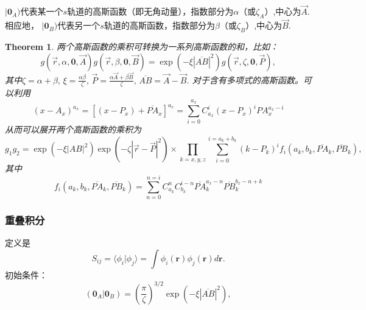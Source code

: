 \documentclass[12pt,a4paper,openany,twoside]{article}
\newtheorem{theorem}{Theorem}[section]
\numberwithin{equation}{section}
\begin{document}
            $|\boldsymbol{0}_A)$代表某一个$s$轨道的高斯函数（即无角动量），指数部分为$\alpha$（或$\zeta_A$）,中心为$\vec{A}$.相应地， $|\boldsymbol{0}_B)$代表另一个$s$轨道的高斯函数，指数部分为$\beta$（或$\zeta_B$）,中心为$\vec{B}$.
            \begin{theorem}
                两个高斯函数的乘积可转换为一系列高斯函数的和\cite{may2006density}，比如：
                \begin{equation}
                    g(\vec{r},\alpha, \boldsymbol{0},\vec{A})g(\vec{r},\beta, \boldsymbol{0},\vec{B}) = \exp(-\xi |\overline{AB}|^2) g(\vec{r},\zeta,\boldsymbol{0},\vec{P}),
                \end{equation}
                其中$\zeta = \alpha + \beta, \, \xi = \frac{\alpha\beta}{\zeta}, \, \vec{P} = \frac{\alpha \vec{A} + \beta \vec{B}}{\zeta}, \, \overline{AB} = \vec{A} - \vec{B}$.
                对于含有多项式的高斯函数。可以利用
                \begin{equation}
                    (x- A_x) ^{a_x} = [(x-P_x) + \overline{PA}_x]^{a_x} = \sum_{i=0}^{a_x} C_{a_x}^i (x-P_x)^i {PA}_x^{a_x - i}
                \end{equation}
                从而可以展开两个高斯函数的乘积为
                \begin{equation}
                    g_1g_2 = \exp(-\xi|AB|^2) \exp(-\zeta|\vec{r} - \vec{P}|^2) \times \prod_{k=x,y,z} \sum_{i=0}^{i=a_k+b_k}(k-P_k)^i f_i (a_k,b_k,\overline{PA}_k,\overline{PB}_k),
                \end{equation}
                其中
                \begin{equation}
                    f_i(a_k,b_k,\overline{PA}_k,\overline{PB}_k) = \sum_{n=0}^{n=i} C_{a_k}^{n} C_{b_k}^{i-n} \overline{PA}_k^{a_x-n}\overline{PB}_k^{b_x-n+k}
                \end{equation}
            \end{theorem}
                \subsubsection{重叠积分}
                定义是
                \begin{equation}
                    S_{ij} = \langle \phi_i | \phi_j \rangle = \int \phi_i(\boldsymbol{r}) \phi_j(\boldsymbol{r}) d \boldsymbol{r}.
                \end{equation}
                初始条件：
                \begin{equation}
                    (\boldsymbol{0}_A|\boldsymbol{0}_B) = \left(\frac{\pi}{\zeta}\right)^{3/2} \exp(- \xi |\overline{AB}|^2),
                \end{equation}
                
\end{document}
